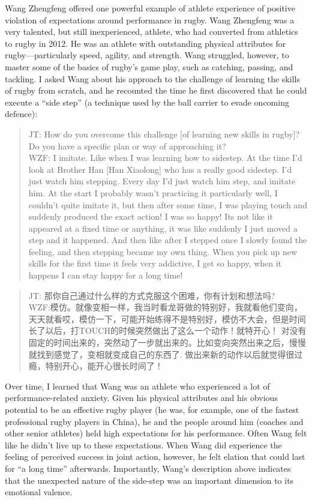 \begin{CJK}{UTF8}{gbsn}
Wang Zhengfeng offered one powerful example of athlete experience of positive violation of expectations around performance in rugby.  Wang Zhengfeng was a very talented, but still inexperienced, athlete, who had converted from athletics to rugby in 2012.  He was an athlete with outstanding physical attributes for rugby---particularly speed, agility, and strength.  Wang struggled, however, to master some of the basics of rugby's game play, such as catching, passing, and tackling. I asked Wang about his approach to the challenge of learning the skills of rugby from scratch, and he recounted the time he first discovered that he could execute a ``side step'' (a technique used by the ball carrier to evade oncoming defence):

    \begin{quote}
      JT: How do you overcome this challenge [of learning new skills in rugby]? Do you have a specific plan or way of approaching it? \\
      WZF: I imitate.  Like when I was learning how to sidestep. At the time I’d look at Brother Han [Han Xiaolong] who has a really good sidestep. I'd just watch him stepping.  Every day I'd just watch him step, and imitate him.  At the start I probably wasn't practicing it particularly well, I couldn't quite imitate it, but then after some time, I was playing touch and suddenly produced the exact action! I was so happy! Its not like it appeared at a fixed time or anything, it was like suddenly I just moved a step and it happened. And then like after I stepped once I slowly found the feeling, and then stepping became my own thing.  When you pick up new skills for the first time it feels very addictive, I get so happy, when it happens I can stay happy for a long time!
    \end{quote}

    \begin{quote}
      JT: 那你自己通过什么样的方式克服这个困难，你有计划和想法吗? \\
      WZF:模仿。就像变相一样，我当时看龙哥做的特别好，我就看他们变向，天天就看哎，模仿一下，可能开始练得不是特别好，模仿不大会，但是时间长了以后，打TOUCH的时候突然做出了这么一个动作！就特开心！ 对没有固定的时间出来的，突然动了一步就出来的。比如变向突然出来之后，慢慢就找到感觉了，变相就变成自己的东西了. 做出来新的动作以后就觉得很过瘾，特别开心，能开心很长时间了！
    \end{quote}

Over time, I learned that Wang was an athlete who experienced a lot of performance-related anxiety.  Given his physical attributes and his obvious potential to be an effective rugby player (he was, for example, one of the fastest professional rugby players in China), he and the people around him (coaches and other senior athletes) held high expectations for his performance.  Often Wang felt like he didn't live up to these expectations.  When Wang did experience the feeling of perceived success in joint action, however, he felt elation that could last for ``a long time'' afterwards.  Importantly, Wang's description above indicates that the unexpected nature of the side-step was an important dimension to its emotional valence.


\end{CJK}
